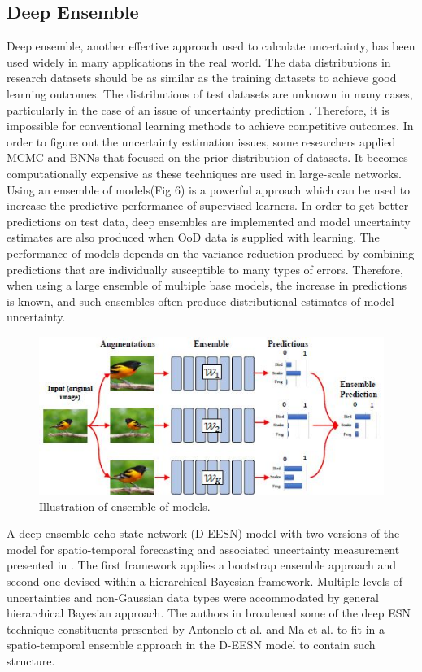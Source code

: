 \documentclass[journal]{IEEEtran}
\begin{document}
\subsection{Deep Ensemble}
Deep ensemble, another effective approach used to calculate uncertainty, has been used widely in many applications in the real world.
The data distributions in research datasets should be as
similar as the training datasets to achieve good learning outcomes.
The distributions of test datasets are unknown in many cases,
particularly in the case of an issue of uncertainty prediction \cite{pearce2018uncertainty}.
Therefore, it is impossible for conventional
learning methods to achieve competitive outcomes.
In order to figure out the uncertainty estimation issues, some researchers
applied MCMC and BNNs that focused on the prior distribution of datasets.
It becomes computationally expensive as these
techniques are used in large-scale networks. Using an ensemble of models(Fig 6) is a powerful approach which can be used to increase the predictive performance of supervised learners.
In order to get better predictions on test data, deep ensembles are implemented and model uncertainty estimates are also produced when OoD data is supplied with learning.\cite{pearce2018uncertainty}
The performance of models depends on the variance-reduction produced by combining
predictions that are individually susceptible to many types of errors.
Therefore, when using a large ensemble of multiple base models, the increase in
predictions is known, and such ensembles often produce distributional estimates of model uncertainty. \cite{abdar2020review}

\begin{figure}[ht]
  \centering
  \includegraphics[scale=0.8]{figures/ensemble.JPG}
  \caption{Illustration of ensemble of models.\cite{abdar2020review}}
\end{figure}

A deep ensemble echo state network (D-EESN) model with two versions of the model for spatio-temporal forecasting and associated uncertainty measurement presented in \cite{pearce2018uncertainty}. The first framework applies a bootstrap ensemble approach and second one devised within a hierarchical Bayesian framework. Multiple levels of uncertainties and non-Gaussian data types were accommodated by general hierarchical Bayesian approach. The authors in broadened some of the deep ESN technique constituents
presented by Antonelo et al. and Ma et al. to fit in
a spatio-temporal ensemble approach in the D-EESN model
to contain such structure.
\end{document}
